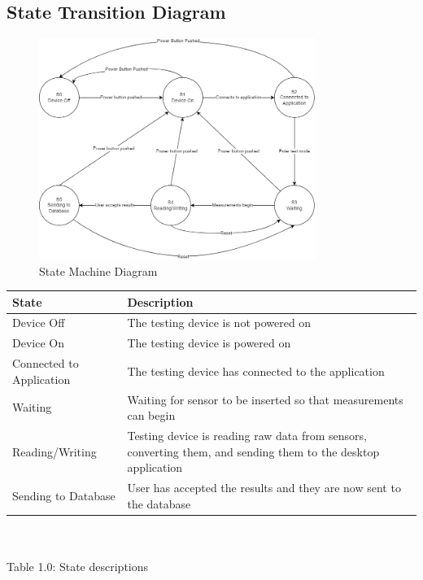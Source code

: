\documentclass[12pt]{article}
\begin{document}
\subsection{State Transition Diagram}
\begin{figure}[h!]
\begin{center}
\includegraphics[width=0.8\textwidth]{state_machine_diagram}
\caption{State Machine Diagram}
\label{Fig_StateMachineDiagram} 
\end{center}
\end{figure}

\begin{tabular}{| p{} | p{}|}
  \hline
  \rowcolor[gray]{0.9}
  State & Description \\
  \hline
  Device Off & The testing device is not powered on\\
  \hline
  Device On &  The testing device is powered on\\
  \hline
  Connected to Application & The testing device has connected to the application \\
  \hline
  Waiting & Waiting for sensor to be inserted so that measurements can begin \\
  \hline
  Reading/Writing & Testing device is reading raw data from sensors, converting them, and sending them to the desktop application \\
  \hline
  Sending to Database & User has accepted the results and they are now sent to the database \\
  \hline
\end{tabular}
\\\\ \indent Table 1.0: State descriptions\\ \\ \\
\end{document}
